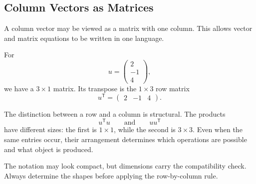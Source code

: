 \subsection{Column Vectors as Matrices}

A column vector may be viewed as a matrix with one column. This allows vector and
matrix equations to be written in one language.

\begin{examplebox}
For
\[
u=
\begin{pmatrix}
2\\-1\\4
\end{pmatrix},
\]
we have a $3\times1$ matrix. Its transpose is the $1\times3$ row matrix
\[
u^{\mathsf T}=\begin{pmatrix}2&-1&4\end{pmatrix}.
\]
\end{examplebox}

\begin{interpretationbox}
The distinction between a row and a column is structural. The products
\[
u^{\mathsf T}u
\qquad\text{and}\qquad
uu^{\mathsf T}
\]
have different sizes: the first is $1\times1$, while the second is $3\times3$.
Even when the same entries occur, their arrangement determines which operations
are possible and what object is produced.
\end{interpretationbox}

\begin{remarkbox}
The notation may look compact, but dimensions carry the compatibility check.
Always determine the shapes before applying the row-by-column rule.
\end{remarkbox}
